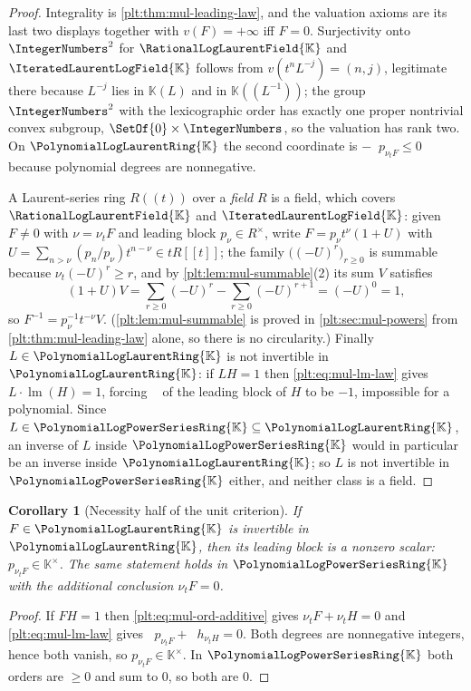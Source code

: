 \documentclass[11pt,oneside]{article}
\theoremstyle{plain}
\newtheorem{corollary}[theorem]{Corollary}
\theoremstyle{definition}
\theoremstyle{remark}
\newcommand{\K}{\mathbb{K}}
\newcommand{\PLpow}{\PolynomialLogPowerSeriesRing{\K}}   %
\newcommand{\PLlau}{\PolynomialLogLaurentRing{\K}}       %
\newcommand{\PLrat}{\RationalLogLaurentField{\K}}        %
\newcommand{\PLit}{\IteratedLaurentLogField{\K}}         %
\newcommand{\ordt}{\nu_{t}}                              %
\DeclareMathOperator{\lm}{lm}
\DeclareMathOperator{\degL}{deg_{L}}
\begin{document}
\begin{proof}
Integrality is \cref{plt:thm:mul-leading-law}, and the valuation axioms are
its last two displays together with $v(F)=+\infty$ iff $F=0$.  Surjectivity
onto $\IntegerNumbers^2$ for $\PLrat$ and $\PLit$ follows from
$v(t^nL^{-j})=(n,j)$, legitimate there because $L^{-j}$ lies in $\K(L)$ and
in $\K((L^{-1}))$; the group $\IntegerNumbers^2$ with the lexicographic order
has exactly one proper nontrivial convex subgroup,
$\SetOf{0}\times\IntegerNumbers$, so the valuation has rank two.  On $\PLlau$
the second coordinate is $-\degL p_{\ordt F}\le0$ because polynomial degrees
are nonnegative.

A Laurent-series ring $R((t))$ over a \emph{field} $R$ is a field, which
covers $\PLrat$ and $\PLit$: given $F\ne0$ with $\nu=\ordt F$ and leading
block $p_\nu\in R^\times$, write $F=p_\nu t^{\nu}(1+U)$ with
$U=\sum_{n>\nu}(p_n/p_\nu)t^{n-\nu}\in tR[[t]]$; the family
$\bigl((-U)^r\bigr)_{r\ge0}$ is summable because $\ordt(-U)^r\ge r$, and by
\cref{plt:lem:mul-summable}(2) its sum $V$ satisfies
\[
 (1+U)V=\sum_{r\ge0}(-U)^r-\sum_{r\ge0}(-U)^{r+1}=(-U)^0=1,
\]
so $F^{-1}=p_\nu^{-1}t^{-\nu}V$.  (\cref{plt:lem:mul-summable} is proved in
\cref{plt:sec:mul-powers} from \cref{plt:thm:mul-leading-law} alone, so there
is no circularity.)  Finally $L\in\PLlau$ is not invertible in
$\PLlau$: if $LH=1$ then \eqref{plt:eq:mul-lm-law} gives
$L\cdot\lm(H)=1$, forcing $\degL$ of the leading block of $H$ to be $-1$,
impossible for a polynomial.
Since $L\in\PLpow\subseteq\PLlau$, an inverse of $L$ inside $\PLpow$ would in
particular be an inverse inside $\PLlau$; so $L$ is not invertible in
$\PLpow$ either, and neither class is a field.
\end{proof}

\begin{corollary}[Necessity half of the unit criterion]
\label{plt:cor:mul-unit-necessary}
If $F\in\PLlau$ is invertible in $\PLlau$, then its leading block is a
nonzero scalar: $p_{\ordt F}\in\K^\times$.  The same statement holds in
$\PLpow$ with the additional conclusion $\ordt F=0$.
\end{corollary}

\begin{proof}
If $FH=1$ then \eqref{plt:eq:mul-ord-additive} gives
$\ordt F+\ordt H=0$ and \eqref{plt:eq:mul-lm-law} gives
$\degL p_{\ordt F}+\degL h_{\ordt H}=0$.  Both degrees are nonnegative
integers, hence both vanish, so $p_{\ordt F}\in\K^\times$.  In $\PLpow$ both
orders are $\ge0$ and sum to $0$, so both are $0$.
\end{proof}
\end{document}
